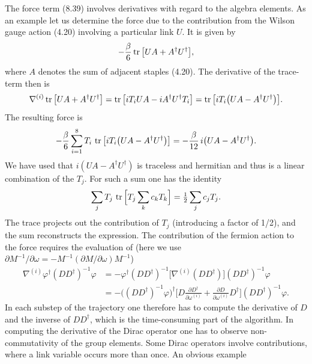 The force term (8.39) involves derivatives with regard to the algebra elements.
As an example let us determine the force due to the contribution from the
Wilson gauge action (4.20) involving a particular link $U$. It is given by
\begin{equation}
-\frac{\beta}{6}\operatorname{tr}\big[UA + A^\dagger U^\dagger\big],
\end{equation}
where $A$ denotes the sum of adjacent staples (4.20). The derivative of the
trace-term then is
\begin{equation}
\nabla^{(i)}\operatorname{tr}\big[UA + A^\dagger U^\dagger\big]
= \operatorname{tr}\big[iT_iUA - iA^\dagger U^\dagger T_i\big]
= \operatorname{tr}\big[iT_i\big(UA - A^\dagger U^\dagger\big)\big].
\end{equation}
The resulting force is
\begin{equation}
-\frac{\beta}{6}\sum_{i=1}^{8}T_i\,\operatorname{tr}\big[iT_i\big(UA - A^\dagger U^\dagger\big)\big]
= -\frac{\beta}{12}\,i\big(UA - A^\dagger U^\dagger\big).
\end{equation}
We have used that $i(UA - A^\dagger U^\dagger)$ is traceless and hermitian and
thus is a linear combination of the $T_j$. For such a sum one has the identity
\begin{equation}
\sum_j T_j\,\operatorname{tr}\Big[T_j\sum_k c_k T_k\Big] = \tfrac{1}{2}\sum_j c_j T_j.
\end{equation}
The trace projects out the contribution of $T_j$ (introducing a factor of
1/2), and the sum reconstructs the expression.
The contribution of the fermion action to the force requires the evaluation of
(here we use $\partial M^{-1}/\partial\omega \allowbreak = \allowbreak -M^{-1}(\partial M/\partial\omega)M^{-1}$)
\begin{equation}
\begin{split}
\nabla^{(i)}\varphi^\dagger(DD^\dagger)^{-1}\varphi
&= -\varphi^\dagger(DD^\dagger)^{-1}\big[\nabla^{(i)}(DD^\dagger)\big](DD^\dagger)^{-1}\varphi \\
&= -\Big((DD^\dagger)^{-1}\varphi\Big)^\dagger
   \Big[D\frac{\partial D^\dagger}{\partial\omega^{(i)}}
   + \frac{\partial D}{\partial\omega^{(i)}}D^\dagger\Big](DD^\dagger)^{-1}\varphi .
\end{split}
\end{equation}
In each substep of the trajectory one therefore has to compute the derivative
of $D$ and the inverse of $DD^\dagger$, which is the time-consuming part of the
algorithm.
In computing the derivative of the Dirac operator one has to observe
non-commutativity of the group elements. Some Dirac operators involve
contributions, where a link variable occurs more than once. An obvious example
